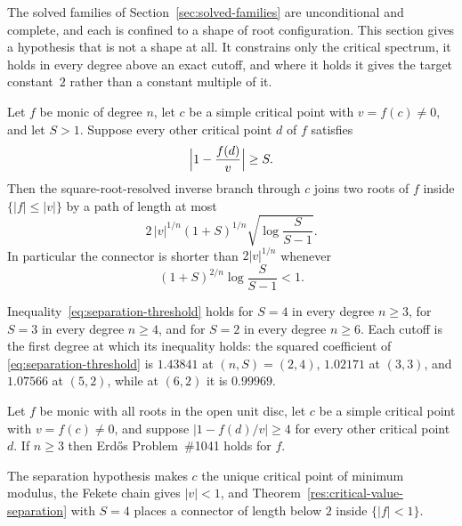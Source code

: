 \documentclass[11pt]{article}
\begin{document}
The solved families of Section~\ref{sec:solved-families} are unconditional and
complete, and each is confined to a shape of root configuration.  This section
gives a hypothesis that is not a shape at all.  It constrains only the critical
spectrum, it holds in every degree above an exact cutoff, and where it holds it
gives the target constant~$2$ rather than a constant multiple of it.

\begin{theorem}\label{res:critical-value-separation}
Let $f$ be monic of degree $n$, let $c$ be a simple critical point with
$v=f(c)\ne0$, and let $S>1$.  Suppose every other critical point $d$ of $f$
satisfies
\[
  \Bigl|1-\frac{f(d)}{v}\Bigr|\ge S .
\]
Then the square-root-resolved inverse branch through $c$ joins two roots of
$f$ inside $\{|f|\le|v|\}$ by a path of length at most
\[
  2\,|v|^{1/n}(1+S)^{1/n}\sqrt{\log\frac{S}{S-1}} .
\]
In particular the connector is shorter than $2|v|^{1/n}$ whenever
\begin{equation}\label{eq:separation-threshold}
  (1+S)^{2/n}\log\frac{S}{S-1}<1 .
\end{equation}
\end{theorem}

\begin{corollary}\label{res:critical-value-thresholds}
Inequality~\eqref{eq:separation-threshold} holds for $S=4$ in every degree
$n\ge3$, for $S=3$ in every degree $n\ge4$, and for $S=2$ in every degree
$n\ge6$.  Each cutoff is the first degree at which its inequality holds: the
squared coefficient of \eqref{eq:separation-threshold} is $1.43841$ at
$(n,S)=(2,4)$, $1.02171$ at $(3,3)$, and $1.07566$ at $(5,2)$, while at
$(6,2)$ it is $0.99969$.
\end{corollary}

\begin{corollary}\label{res:separation-parent}
Let $f$ be monic with all roots in the open unit disc, let $c$ be a simple
critical point with $v=f(c)\ne0$, and suppose $|1-f(d)/v|\ge4$ for every other
critical point $d$.  If $n\ge3$ then Erd\H{o}s Problem~\#1041 holds for $f$.
\end{corollary}

\noindent The separation hypothesis makes $c$ the unique critical point of
minimum modulus, the Fekete chain gives $|v|<1$, and
Theorem~\ref{res:critical-value-separation} with $S=4$ places a connector of
length below $2$ inside $\{|f|<1\}$.
\end{document}
